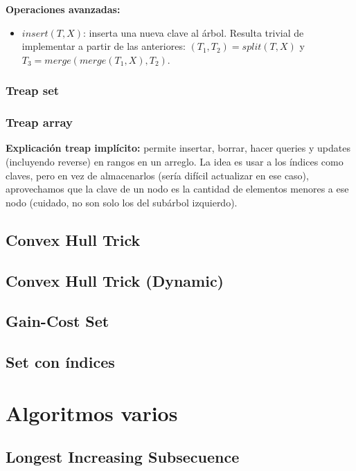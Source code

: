 \textbf{Operaciones avanzadas:}
\begin{itemize}
	\item $insert(T, X)$: inserta una nueva clave al árbol. Resulta trivial de implementar a partir de las anteriores:
	$(T_1, T_2) = split(T, X)$ y $T_3 = merge(merge(T_1, X), T_2)$.
\end{itemize}
\subsubsection{Treap set}
\subsubsection{Treap array}
\textbf{Explicación treap implícito:} permite insertar, borrar, hacer queries y updates (incluyendo reverse) en rangos
en un arreglo. La idea es usar a los índices como claves, pero en vez de almacenarlos (sería difícil actualizar en ese caso),
aprovechamos que la clave de un nodo es la cantidad de elementos menores a ese nodo (cuidado, no son solo los del
subárbol izquierdo).

\subsection{Convex Hull Trick}
\subsection{Convex Hull Trick (Dynamic)}
\subsection{Gain-Cost Set}
\subsection{Set con índices}


\section{Algoritmos varios}%
\subsection{Longest Increasing Subsecuence}
